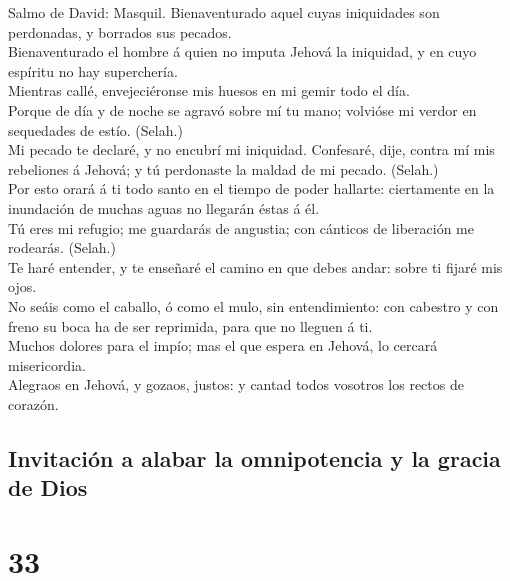  Salmo de David: Masquil. Bienaventurado aquel cuyas
iniquidades son perdonadas, y borrados sus pecados.\\
 Bienaventurado el hombre á quien no imputa Jehová la
iniquidad, y en cuyo espíritu no hay superchería.\\
 Mientras callé, envejeciéronse mis huesos en mi gemir
todo el día.\\
 Porque de día y de noche se agravó sobre mí tu mano;
volvióse mi verdor en sequedades de estío. (Selah.)\\
 Mi pecado te declaré, y no encubrí mi iniquidad.
Confesaré, dije, contra mí mis rebeliones á Jehová; y tú perdonaste la
maldad de mi pecado. (Selah.)\\
 Por esto orará á ti todo santo en el tiempo de poder
hallarte: ciertamente en la inundación de muchas aguas no llegarán éstas
á él.\\
 Tú eres mi refugio; me guardarás de angustia; con
cánticos de liberación me rodearás. (Selah.)\\
 Te haré entender, y te enseñaré el camino en que debes
andar: sobre ti fijaré mis ojos.\\
 No seáis como el caballo, ó como el mulo, sin
entendimiento: con cabestro y con freno su boca ha de ser reprimida,
para que no lleguen á ti.\\
 Muchos dolores para el impío; mas el que espera en
Jehová, lo cercará misericordia.\\
 Alegraos en Jehová, y gozaos, justos: y cantad todos
vosotros los rectos de corazón.

\hypertarget{invitaciuxf3n-a-alabar-la-omnipotencia-y-la-gracia-de-dios}{%
\subsection{Invitación a alabar la omnipotencia y la gracia de
Dios}\label{invitaciuxf3n-a-alabar-la-omnipotencia-y-la-gracia-de-dios}}

\hypertarget{section-32}{%
\section{33}\label{section-32}}

